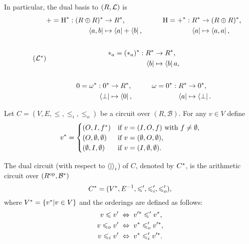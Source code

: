 In particular, the dual basis to $(R,\mathcal{L})$ is 
\begin{equation}
  \label{eq:tbasis-star}
  \tag{$\dual{\Tbasis}$}
  \begin{gathered}
    \begin{aligned}
      +=\dual{\hub} : \dual{(R\oplus R)} &\ra \dual{R}\text{,}  &  \hub=\dual{+} : \dual{R} &\ra \dual{(R\oplus R)}\text{,}\\
      \bra{a,b} &\mapsto \bra{a}+\bra{b}\text{,}\qquad   &      \bra{a} &\mapsto \bra{a,a}\text{,}\\
    \end{aligned}\\ \\
    \begin{aligned}
      \rmul{a}=\dual{(\rmul{a})} : \dual{R} &\ra \dual{R}\text{,} \\
                                             \bra{b} &\mapsto \bra{b}a\text{,}
    \end{aligned}\\ \\
    \begin{aligned}
      0=\dual{\omega} : \dual{0} &\ra \dual{R}\text{,}\qquad  & \omega=\dual{0} : \dual{R} &\ra \dual{0}\text{,} \\
      \bra{\bom} &\mapsto \bra{0}\text{,} &          \bra{a} &\mapsto \bra{\bom}\text{.}
    \end{aligned}
  \end{gathered}
\end{equation}

\begin{definition}
  \label{def:dual}
  Let $C=(V,E,\le,\le_i,\le_o)$ be a circuit over
  $(R,\mathcal{B})$. For any $v\in V$ define
  \begin{equation}
    \label{eq:244}
    v^\ast =
    \begin{cases}
    (O,I,f^\ast)          &\text{if $v=(I,O,f)$ with $f\ne\emptyset$,}\\
    (O,\emptyset,\emptyset) &\text{if $v=(\emptyset,O,\emptyset)$,}\\
    (\emptyset,I,\emptyset) &\text{if $v=(I,\emptyset,\emptyset)$.}
    \end{cases}
  \end{equation}

  The dual circuit (with respect to $\left\langle  \middle|  \right\rangle_i$) of $C$, denoted
  by $C^\ast$, is the arithmetic circuit over
  $(R^{\mathrm{op}},\mathcal{B}^\ast)$
  \[C^\ast = (V^\ast, E^{-1},\leqslant',\leqslant_i',\leqslant_o')\text{,}\]
  where $V^\ast=\{v^\ast|v\in V\}$ and the orderings are defined
  as follows:
  \begin{align}
    v \leqslant v' \;&\Leftrightarrow\; v'^\ast \leqslant' v^\ast\text{,}\\
    v \leqslant_o v' \;&\Leftrightarrow\; v^\ast \leqslant_o' v'^\ast\text{,}\\
    v \leqslant_i v' \;&\Leftrightarrow\; v^\ast \leqslant_i' v'^\ast\text{.}
  \end{align}
\end{definition}

